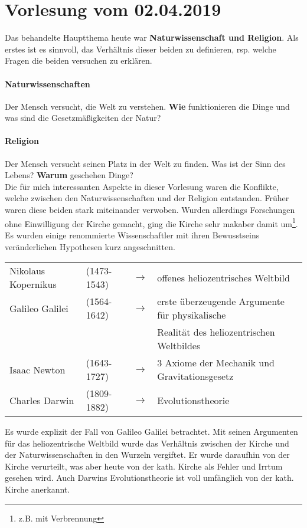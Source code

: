 \section{Vorlesung vom 02.04.2019}
Das behandelte Hauptthema heute war \textbf{Naturwissenschaft und Religion}. Als erstes ist es sinnvoll, das Verhältnis dieser beiden zu definieren, rsp. welche Fragen die beiden versuchen zu erklären.\\

\paragraph{Naturwissenschaften}
Der Mensch versucht, die Welt zu verstehen. \textbf{Wie} funktionieren die Dinge und was sind die Gesetzmäßigkeiten der Natur?\\

\paragraph{Religion}
Der Mensch versucht seinen Platz in der Welt zu finden. Was ist der Sinn des Lebens? \textbf{Warum} geschehen Dinge?\\

Die für mich interessanten Aspekte in dieser Vorlesung waren die Konflikte, welche zwischen den Naturwissenschaften und der Religion entstanden. Früher waren diese beiden stark miteinander verwoben. Wurden allerdings Forschungen ohne Einwilligung der Kirche gemacht, ging die Kirche sehr makaber damit um\footnote{z.B. mit Verbrennung}. Es wurden einige renommierte Wissenschaftler mit ihren Bewusstseins veränderlichen Hypothesen kurz angeschnitten.\\


\begin{tabular}{llll}
	Nikolaus Kopernikus & (1473-1543) & $\rightarrow$ & offenes
	heliozentrisches Weltbild \\ 
	Galileo Galilei  & (1564-1642) & $\rightarrow$ & erste überzeugende Argumente für 			physikalische\\
 	 & & &  Realität des heliozentrischen Weltbildes \\
	Isaac Newton & (1643-1727) & $\rightarrow$ & 3 Axiome der Mechanik und
	Gravitationsgesetz \\ 
	Charles Darwin & (1809-1882) & $\rightarrow$ & Evolutionstheorie \\ 
\end{tabular} 

Es wurde explizit der Fall von Galileo Galilei betrachtet. Mit seinen Argumenten für das heliozentrische Weltbild wurde das Verhältnis zwischen der Kirche und der Naturwissenschaften in den Wurzeln vergiftet. Er wurde daraufhin von der Kirche verurteilt, was aber heute von der kath. Kirche als Fehler und Irrtum gesehen wird. Auch Darwins Evolutionstheorie ist voll umfänglich von der kath. Kirche anerkannt. \\

